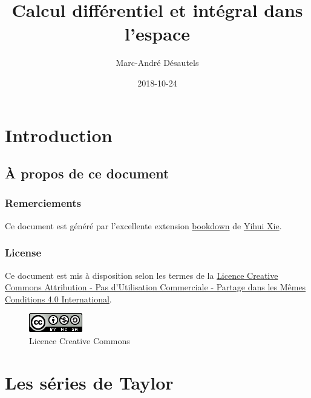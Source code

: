 \documentclass[]{book}
\title{Calcul différentiel et intégral dans l'espace}
\author{Marc-André Désautels}
\date{2018-10-24}
\theoremstyle{definition}
\theoremstyle{definition}
\theoremstyle{definition}
\theoremstyle{remark}
\begin{document}
\maketitle

{
\setcounter{tocdepth}{2}
\tableofcontents
}
\hypertarget{introduction}{%
\chapter*{Introduction}\label{introduction}}

\hypertarget{a-propos-de-ce-document}{%
\section*{À propos de ce document}\label{a-propos-de-ce-document}}

\hypertarget{remerciements}{%
\subsection*{Remerciements}\label{remerciements}}

Ce document est généré par l'excellente extension
\href{https://bookdown.org/}{bookdown} de
\href{https://yihui.name/}{Yihui Xie}.

\hypertarget{license}{%
\subsection*{License}\label{license}}

Ce document est mis à disposition selon les termes de la
\href{http://creativecommons.org/licenses/by-nc-sa/4.0/}{Licence
Creative Commons Attribution - Pas d'Utilisation Commerciale - Partage
dans les Mêmes Conditions 4.0 International}.

\begin{figure}
\centering
\includegraphics{resources/icons/license_cc.png}
\caption{Licence Creative Commons}
\end{figure}

\hypertarget{taylor}{%
\chapter{Les séries de Taylor}\label{taylor}}
\end{document}
